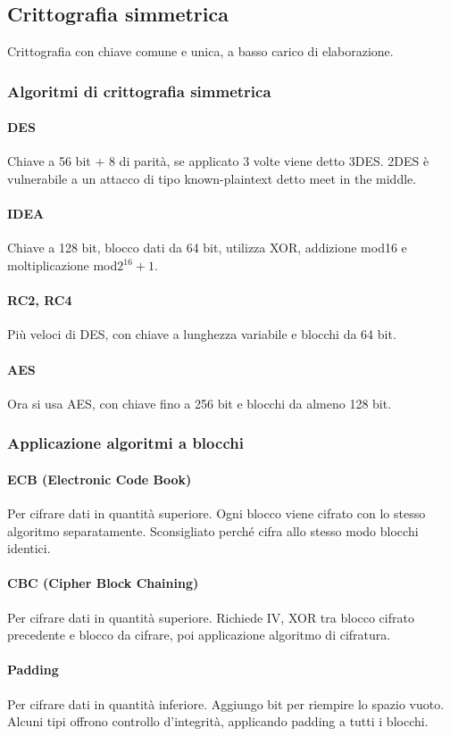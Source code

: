 \documentclass[11pt]{article}
\begin{document}
\subsection{Crittografia simmetrica}
Crittografia con chiave comune e unica, a basso carico di elaborazione.
\subsubsection{Algoritmi di crittografia simmetrica}
\paragraph*{DES}
Chiave a 56 bit + 8 di parità, se applicato 3 volte viene detto 3DES. 2DES è vulnerabile a un attacco di tipo known-plaintext
detto meet in the middle.
\paragraph*{IDEA}
Chiave a 128 bit, blocco dati da 64 bit, utilizza XOR, addizione mod16 e moltiplicazione mod$2^{16}+1$.
\paragraph*{RC2, RC4}
Più veloci di DES, con chiave a lunghezza variabile e blocchi da 64 bit.
\paragraph*{AES}
Ora si usa AES, con chiave fino a 256 bit e blocchi da almeno 128 bit.
\subsubsection{Applicazione algoritmi a blocchi}
\paragraph*{ECB (Electronic Code Book)}
Per cifrare dati in quantità superiore. Ogni blocco viene cifrato con lo stesso algoritmo separatamente. Sconsigliato 
perché cifra allo stesso modo blocchi identici.
\paragraph*{CBC (Cipher Block Chaining)}
Per cifrare dati in quantità superiore. Richiede IV, XOR tra blocco cifrato precedente e blocco da cifrare, poi applicazione 
algoritmo di cifratura.
\paragraph*{Padding}
Per cifrare dati in quantità inferiore. Aggiungo bit per riempire lo spazio vuoto. Alcuni tipi offrono controllo d'integrità,
applicando padding a tutti i blocchi.
\end{document}
